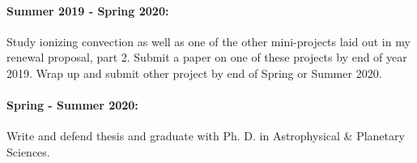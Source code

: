 \documentclass[aasms,12pt]{article}
\begin{document}
\paragraph{Summer 2019 - Spring 2020:} Study ionizing convection as well as one of the other mini-projects
laid out in my renewal proposal, part 2. Submit a paper on one of these projects by end of
year 2019. Wrap up and submit other project by end of Spring or Summer 2020.

\vspace{-0.4cm}
\paragraph{Spring - Summer 2020:} Write and defend thesis and graduate with Ph. D. in Astrophysical \& Planetary Sciences.
\end{document}
